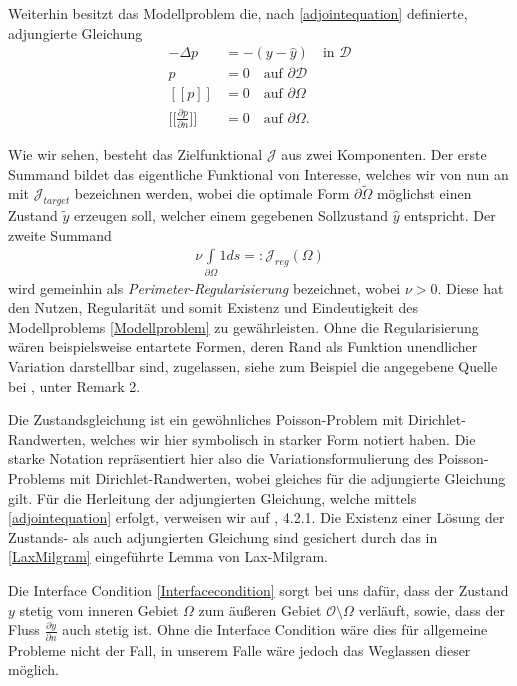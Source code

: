\begin{defi}[Modellproblem]
	Weiterhin besitzt das Modellproblem die, nach \ref{adjointequation} 				definierte, adjungierte Gleichung 
	\begin{equation}\label{Modelladjoint}
		\begin{aligned}
		-\Delta p &= - (y - \hat{y}) \quad \text{in } \mathcal{D} \\
		p &= 0 \quad \text{auf } \partial\mathcal{D} \\
		[[p]] &= 0 \quad\text{auf } \partial\Omega \\ 
		\Big[\Big[\frac{\partial p}{\partial n}\Big]\Big] &= 0 \quad\text{auf } \partial\Omega.
		\end{aligned}
	\end{equation}	 
\end{defi}

Wie wir sehen, besteht das Zielfunktional $\mathcal{J}$ aus zwei Komponenten. Der erste Summand bildet das eigentliche Funktional von Interesse, welches wir von nun an mit $\mathcal{J}_{target}$ bezeichnen werden, wobei die optimale Form $\partial\tilde{\Omega}$ möglichst einen Zustand $\tilde{y}$ erzeugen soll, welcher einem gegebenen Sollzustand $\hat{y}$ entspricht. Der zweite Summand
\begin{align*}
	\nu\underset{\partial\Omega}{\int} 1 ds =: \mathcal{J}_{reg}(\Omega)
\end{align*}
wird gemeinhin als \textit{Perimeter-Regularisierung} bezeichnet, wobei $\nu > 0$. Diese hat den Nutzen, Regularität und somit Existenz und Eindeutigkeit des Modellproblems \ref{Modellproblem} zu gewährleisten. Ohne die Regularisierung wären beispielsweise entartete Formen, deren Rand als Funktion unendlicher Variation darstellbar sind, zugelassen, siehe zum Beispiel die angegebene Quelle bei \cite{LagrangeNewton}, unter Remark 2.

Die Zustandsgleichung ist ein gewöhnliches Poisson-Problem mit Dirichlet-Randwerten, welches wir hier symbolisch in starker Form notiert haben. Die starke Notation repräsentiert hier also die Variationsformulierung des Poisson-Problems mit Dirichlet-Randwerten, wobei gleiches für die adjungierte Gleichung gilt. Für die Herleitung der adjungierten Gleichung, welche mittels \ref{adjointequation} erfolgt, verweisen wir auf \cite{shape_space}, 4.2.1. Die Existenz einer Lösung der  Zustands- als auch adjungierten Gleichung sind gesichert durch das in \ref{LaxMilgram} eingeführte Lemma von Lax-Milgram.

Die Interface Condition \ref{Interfacecondition} sorgt bei uns dafür, dass der Zustand $y$ stetig vom inneren Gebiet $\Omega$ zum äußeren Gebiet $\mathcal{O} \setminus \Omega$ verläuft, sowie, dass der Fluss $\frac{\partial y }{\partial n}$ auch stetig ist. Ohne die Interface Condition wäre dies für allgemeine Probleme nicht der Fall, in unserem Falle wäre jedoch das Weglassen dieser möglich. 

